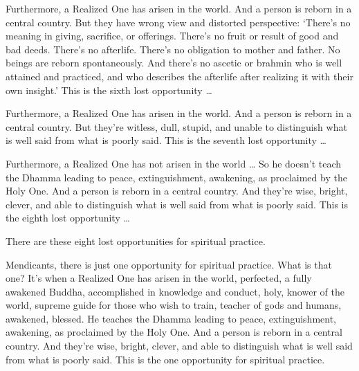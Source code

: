 \documentclass[12pt,openany]{book}%
\begin{document}
Furthermore, a Realized One has arisen in the world. And a person is reborn in a central country. But they have wrong view and distorted perspective: ‘There’s no meaning in giving, sacrifice, or offerings. There’s no fruit or result of good and bad deeds. There’s no afterlife. There’s no obligation to mother and father. No beings are reborn spontaneously. And there’s no ascetic or brahmin who is well attained and practiced, and who describes the afterlife after realizing it with their own insight.’ This is the sixth lost opportunity … 

Furthermore, a Realized One has arisen in the world. And a person is reborn in a central country. But they’re witless, dull, stupid, and unable to distinguish what is well said from what is poorly said. This is the seventh lost opportunity … 

Furthermore, a Realized One has not arisen in the world … So he doesn’t teach the Dhamma leading to peace, extinguishment, awakening, as proclaimed by the Holy One. And a person is reborn in a central country. And they’re wise, bright, clever, and able to distinguish what is well said from what is poorly said. This is the eighth lost opportunity … 

There are these eight lost opportunities for spiritual practice. 

Mendicants, there is just one opportunity for spiritual practice. What is that one? It’s when a Realized One has arisen in the world, perfected, a fully awakened Buddha, accomplished in knowledge and conduct, holy, knower of the world, supreme guide for those who wish to train, teacher of gods and humans, awakened, blessed. He teaches the Dhamma leading to peace, extinguishment, awakening, as proclaimed by the Holy One. And a person is reborn in a central country. And they’re wise, bright, clever, and able to distinguish what is well said from what is poorly said. This is the one opportunity for spiritual practice. 
\end{document}
